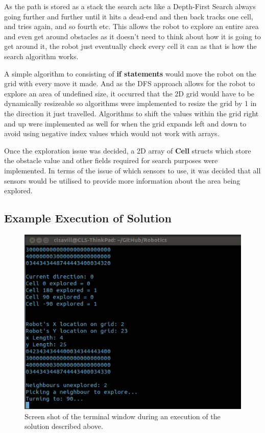 \documentclass[a4paper,12pt]{article}
\begin{document}
\vspace{5mm}
\noindent As the path is stored as a stack the search acts like a Depth-First Search always going further and further until it hits a dead-end and then back tracks one cell, and tries again, and so fourth etc. This allows the robot to explore an entire area and even get around obstacles as it doesn't need to think about how it is going to get around it, the robot just eventually check every cell it can as that is how the search algorithm works.

\vspace{5mm}
\noindent A simple algorithm to consisting of \textbf{if statements} would move the robot on the grid with every move it made. And as the DFS approach allows for the robot to explore an area of undefined size, it occurred that the 2D grid would have to be dynamically resizeable so algorithms were implemented to resize the grid by 1 in the direction it just travelled. Algorithms to shift the values within the grid right and up were implemented as well for when the grid expands left and down to avoid using negative index values which would not work with arrays.

\vspace{5mm}
\noindent Once the exploration issue was decided, a 2D array of \textbf{Cell} structs which store the obstacle value and other fields required for search purposes were implemented. In terms of the issue of which sensors to use, it was decided that all sensors would be utilised to provide more information about the area being explored.

\subsection{Example Execution of Solution}

\begin{figure}[H]
\includegraphics[scale=0.8]{robotics7Terminal.png}
\caption{Screen shot of the terminal window during an execution of the solution described above.}
\end{figure}
\end{document}
